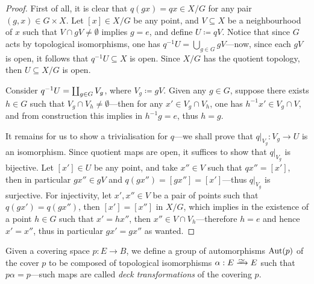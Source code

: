 \begin{proof}
First of all, it is clear that \(q(g x) = q x \in X/G\) for any pair
\((g, x) \in G \times X\). Let \([x] \in X/G\) be any point, and
\(V \subseteq X\) be a neighbourhood of \(x\) such that
\(V \cap g V \neq \emptyset\) implies \(g = e\), and define \(U \coloneq q
V\). Notice that since \(G\) acts by topological isomorphisms, one has
\(q^{-1} U = \bigcup_{g \in G} g V\)---now, since each \(g V\) is open, it
follows that \(q^{-1} U \subseteq X\) is open. Since \(X/G\) has the quotient
topology, then \(U \subseteq X/G\) is open.

Consider \(q^{-1} U = \coprod_{g \in G} V_g\), where \(V_g \coloneq g
V\). Given any \(g \in G\), suppose there exists \(h \in G\) such that
\(V_g \cap V_h \neq \emptyset\)---then for any \(x' \in V_g \cap V_h\), one has
\(h^{-1} x' \in V_g \cap V\), and from construction this implies in
\(h^{-1} g = e\), thus \(h = g\).

It remains for us to show a trivialisation for \(q\)---we shall prove that
\(q|_{V_g}: V_g \to U\) is an isomorphism. Since quotient maps are open, it
suffices to show that \(q|_{V_g}\) is bijective. Let \([x'] \in U\) be any
point, and take \(x'' \in V\) such that \(q x'' = [x']\), then in particular
\(g x'' \in g V\) and \(q(g x'') = [g x''] = [x']\)---thus \(q|_{V_g}\) is
surjective. For injectivity, let \(x', x'' \in V\) be a pair of points such that
\(q(g x') = q(g x'')\), then \([x'] = [x'']\) in \(X/G\), which implies in the
existence of a point \(h \in G\) such that \(x' = h x''\), then
\(x'' \in V \cap V_h\)---therefore \(h = e\) and hence \(x' = x''\), thus in
particular \(g x' = g x''\) as wanted.
\end{proof}

\begin{definition}
\label{def:deck-transformations}
Given a covering space \(p: E \to B\), we define a group of automorphisms
\(\operatorname{Aut}(p)\) of the cover \(p\) to be composed of topological isomorphisms
\(\alpha: E \isoto E\) such that \(p \alpha = p\)---such maps are called
\emph{deck transformations} of the covering \(p\).
\end{definition}

